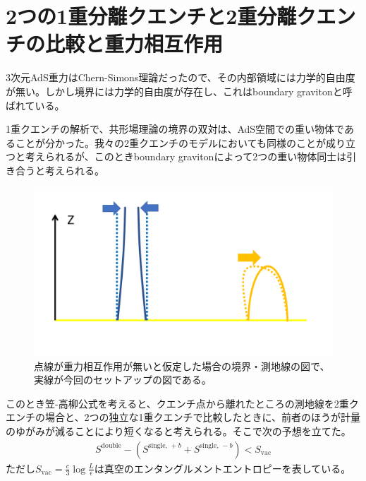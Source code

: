 \section{2つの1重分離クエンチと2重分離クエンチの比較と重力相互作用}\label{sec:DSQSPQ}

3次元AdS重力はChern-Simons理論だったので、その内部領域には力学的自由度が無い。しかし境界には力学的自由度が存在し、これはboundary gravitonと呼ばれている。

1重クエンチの解析で、共形場理論の境界の双対は、AdS空間での重い物体であることが分かった。我々の2重クエンチのモデルにおいても同様のことが成り立つと考えられるが、このときboundary gravitonによって2つの重い物体同士は引き合うと考えられる。
\begin{figure}[h]
	\centering
	\includegraphics[width=0.7\linewidth]{DQgravdual.pdf}
	\caption{点線が重力相互作用が無いと仮定した場合の境界・測地線の図で、実線が今回のセットアップの図である。}
	\label{fig:dqgravdual}
\end{figure}
このとき笠-高柳公式を考えると、クエンチ点から離れたところの測地線を2重クエンチの場合と、2つの独立な1重クエンチで比較したときに、前者のほうが計量のゆがみが減ることにより短くなると考えられる。そこで次の予想を立てた。
\begin{align}\label{conjecture}
S^\text{double}-(S^{\text{single, }+b}+S^{\text{single, }-b})<S_\text{vac}
\end{align}
ただし$S_\text{vac}=\frac{c}{3}\log\frac{L}{\epsilon}$は真空のエンタングルメントエントロピーを表している。

